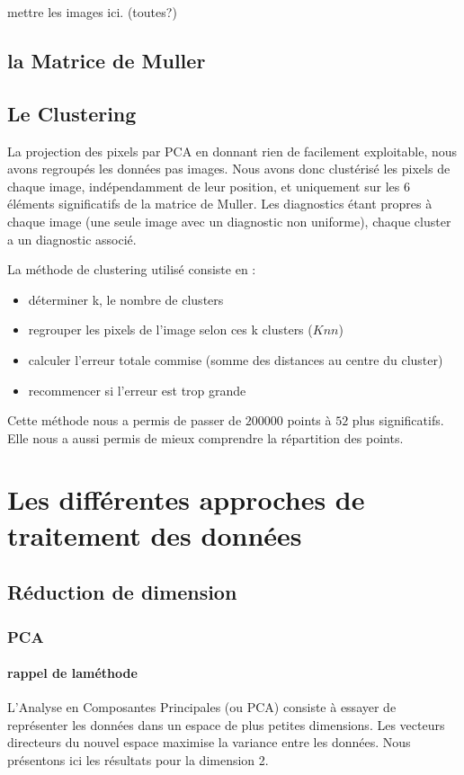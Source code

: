 \documentclass[a4paper,10pt]{report}
\begin{document}
mettre les images ici. (toutes?)

\subsection{la Matrice de Muller}


\subsection{Le Clustering}
La projection des pixels par PCA en donnant rien de facilement exploitable, nous avons regroupés les données pas images. Nous avons donc clustérisé les pixels de chaque image, indépendamment de leur position, et uniquement sur les $6$ éléments significatifs de la matrice de Muller. Les diagnostics étant propres à chaque image (une seule image avec un diagnostic non uniforme), chaque cluster a un diagnostic associé. 

La méthode de clustering utilisé consiste en :
\begin{itemize}
\item déterminer k, le nombre de clusters
\item regrouper les pixels de l'image selon ces k clusters ($Knn$)
\item calculer l'erreur totale commise (somme des distances au centre du cluster)
\item recommencer si l'erreur est trop grande
\end{itemize}

Cette méthode nous a permis de passer de $200 000$ points à $52$ plus significatifs. Elle nous a aussi permis de mieux comprendre la répartition des points.
\section{Les différentes approches de traitement des données}

\subsection{Réduction de dimension}
\subsubsection{PCA}
\paragraph{rappel de laméthode }
L'Analyse en Composantes Principales (ou PCA) consiste à essayer de représenter les données dans un espace de plus petites dimensions. Les vecteurs directeurs du nouvel espace maximise la variance entre les données. Nous présentons ici les résultats pour la dimension 2.
\end{document}
